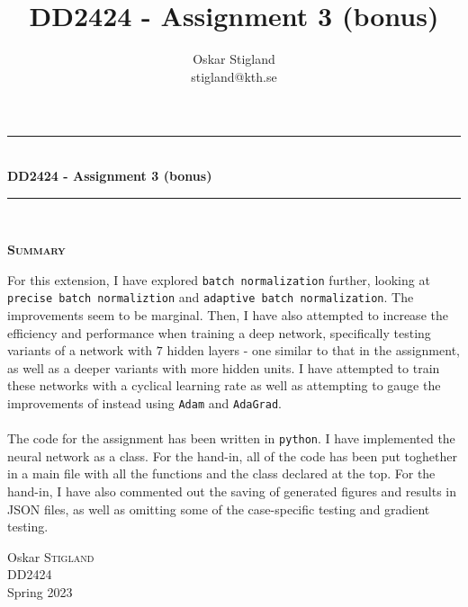 \documentclass{article}
\title{DD2424 - Assignment 3 (bonus)}
\author{Oskar Stigland \\ stigland@kth.se}
\begin{document}

	\begin{titlepage}
		\begin{center} 
			
			\rule{\linewidth}{0.5mm}\\[0.5 cm]
			{ \huge \bfseries DD2424 - Assignment 3 (bonus)}\\[0.3 cm] %
			\rule{\linewidth}{0.5mm}\\[1 cm]
					
			\small\vfill
			\begin{center}
			\centering
			{\large \bfseries \textsc{Summary}}\\
			\vspace{1cm}
			\begin{minipage}{10cm}
				
				For this extension,  I have explored \texttt{batch normalization} further, looking at \texttt{precise batch normaliztion} and \texttt{adaptive batch normalization}. The improvements seem to be marginal. Then, I have also attempted to increase the efficiency and performance when training a deep network,  specifically testing variants of a network with $7$ hidden layers - one similar to that in the assignment, as well as a deeper variants with more hidden units. I have attempted to train these networks with a cyclical learning rate as well as attempting to gauge the improvements of instead using \texttt{Adam} and \texttt{AdaGrad}.\\\\
%
	The code for the assignment has been written in \texttt{python}. I have implemented the neural network as a class. For the hand-in, all of the code has been put toghether in a main file with all the functions and the class declared at the top. For the hand-in, I have also commented out the saving of generated figures and results in JSON files, as well as omitting some of the case-specific testing and gradient testing.
			\end{minipage}
			\end{center}
			\large\vfill
						

		\end{center}	
		
		\begin{minipage}{0.4\textwidth}
			\begin{flushleft} \large
				Oskar \textsc{Stigland}\\
				DD2424\\
				Spring 2023
			\end{flushleft}
		\end{minipage}	

	\end{titlepage}
\end{document}
